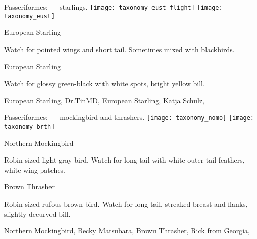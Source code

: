 \documentclass[t]{beamer}
\newcommand{\backoneline}{\vspace{-\baselineskip}}
\begin{document}
\begin{frame}{Passeriformes:  — starlings.}
	\texttt{[image: taxonomy\_eust\_flight]}\hfill
	\texttt{[image: taxonomy\_eust]}
	
	\backoneline
	
	\begin{multicols}{2}
		European Starling
		
		\medskip
		
		Watch for pointed wings and short tail. Sometimes mixed with blackbirds.
		
		
		\columnbreak
		
		European Starling
		
		\medskip
		
		Watch for glossy green-black with white spots, bright yellow bill.
		
	\end{multicols}	
	
	
	\vfilll
	
	\tiny
	
	\href{https://www.flickr.com/photos/mr_t_in_dc/6304096569}{European Starling, Dr.TinMD, } \hfill 
	\href{https://flickr.com/photos/treegrow/33244397614}{European Starling, Katja Schulz, }
	
	
\end{frame}

%

\begin{frame}{Passeriformes:  — mockingbird and thrashers.}
	\texttt{[image: taxonomy\_nomo]}\hfill
	\texttt{[image: taxonomy\_brth]}
	
	\backoneline
	
	\begin{multicols}{2}
		Northern Mockingbird
		
		\medskip
		
		Robin-sized light gray bird. Watch for long tail with white outer tail feathers, white wing patches.
		
		
		\columnbreak
		
		Brown Thrasher
		
		\medskip
		
		Robin-sized rufous-brown bird. Watch for long tail, streaked breast and flanks, slightly decurved bill.
		
	\end{multicols}	
	
	
	\vfilll
	
	\tiny
	
	\href{https://www.flickr.com/photos/130819719@N05/39505827385}{Northern Mockingbird, Becky Matsubara, } \hfill 
	\href{https://flickr.com/photos/rick_al/41869016892}{Brown Thrasher, Rick from Georgia, }
	
	
\end{frame}
\end{document}
